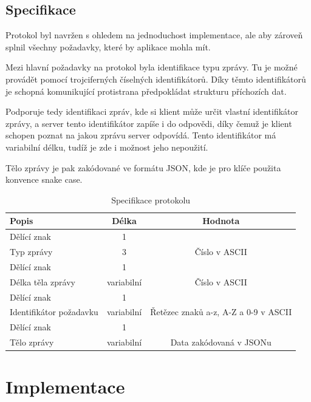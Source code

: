 \documentclass[12pt, a4paper]{article}
\begin{document}
    \subsection{Specifikace}
    Protokol byl navržen s ohledem na jednoduchost implementace, ale aby zároveň splnil všechny požadavky, které by aplikace mohla mít.
    
    Mezi hlavní požadavky na protokol byla identifikace typu zprávy.
    Tu je možné provádět pomocí trojciferných číselných identifikátorů.
    Díky těmto identifikátorů je schopná komunikující protistrana předpokládat strukturu příchozích dat.

    Podporuje tedy identifikaci zpráv, kde si klient může určit vlastní identifikátor zprávy, a server tento identifikátor zapíše i do odpovědi, díky čemuž je klient schopen poznat na jakou zprávu server odpovídá.
    Tento identifikátor má variabilní délku, tudíž je zde i možnost jeho nepoužití.

    Tělo zprávy je pak zakódované ve formátu JSON, kde je pro klíče použita konvence snake case. 

    \begin{table}[H]
        \centering
        \begin{tabular}{|l|c|c|}
            \hline
            Popis & Délka & Hodnota\\
            \hline
            \hline
            Dělící znak & 1 & \uv{|} \\
            \hline
            Typ zprávy & 3 & Číslo v ASCII \\
            \hline
            Dělící znak & 1 & \uv{|} \\
            \hline
            Délka těla zprávy & variabilní & Číslo v ASCII \\
            \hline
            Dělící znak & 1 & \uv{|} \\
            \hline
            Identifikátor požadavku & variabilní & Řetězec znaků a-z, A-Z a 0-9 v ASCII \\
            \hline
            Dělící znak & 1 & \uv{|} \\
            \hline
            Tělo zprávy & variabilní & Data zakódovaná v JSONu \\
            \hline
        \end{tabular}
        \caption{Specifikace protokolu}
    \end{table}

    \section{Implementace}
\end{document}
